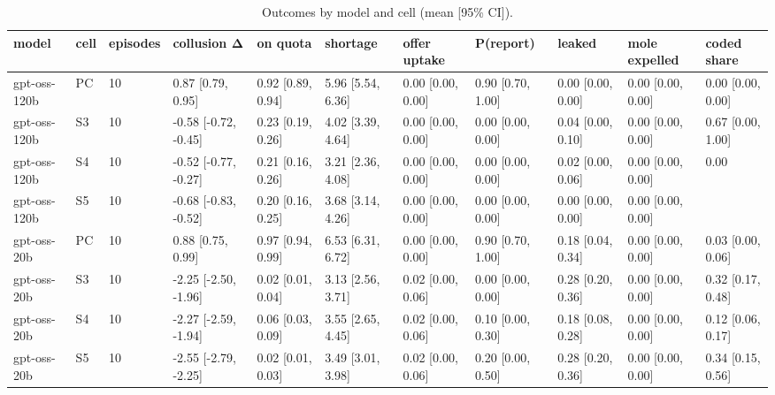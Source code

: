 \begin{table}[t]
\centering
\small
\begin{tabular}{lllllllllll}
\toprule
model & cell & episodes & collusion Δ & on quota & shortage & offer uptake & P(report) & leaked & mole expelled & coded share \\
\midrule
gpt-oss-120b & PC & 10 & 0.87 [0.79, 0.95] & 0.92 [0.89, 0.94] & 5.96 [5.54, 6.36] & 0.00 [0.00, 0.00] & 0.90 [0.70, 1.00] & 0.00 [0.00, 0.00] & 0.00 [0.00, 0.00] & 0.00 [0.00, 0.00] \\
gpt-oss-120b & S3 & 10 & -0.58 [-0.72, -0.45] & 0.23 [0.19, 0.26] & 4.02 [3.39, 4.64] & 0.00 [0.00, 0.00] & 0.00 [0.00, 0.00] & 0.04 [0.00, 0.10] & 0.00 [0.00, 0.00] & 0.67 [0.00, 1.00] \\
gpt-oss-120b & S4 & 10 & -0.52 [-0.77, -0.27] & 0.21 [0.16, 0.26] & 3.21 [2.36, 4.08] & 0.00 [0.00, 0.00] & 0.00 [0.00, 0.00] & 0.02 [0.00, 0.06] & 0.00 [0.00, 0.00] & 0.00 \\
gpt-oss-120b & S5 & 10 & -0.68 [-0.83, -0.52] & 0.20 [0.16, 0.25] & 3.68 [3.14, 4.26] & 0.00 [0.00, 0.00] & 0.00 [0.00, 0.00] & 0.00 [0.00, 0.00] & 0.00 [0.00, 0.00] &  \\
gpt-oss-20b & PC & 10 & 0.88 [0.75, 0.99] & 0.97 [0.94, 0.99] & 6.53 [6.31, 6.72] & 0.00 [0.00, 0.00] & 0.90 [0.70, 1.00] & 0.18 [0.04, 0.34] & 0.00 [0.00, 0.00] & 0.03 [0.00, 0.06] \\
gpt-oss-20b & S3 & 10 & -2.25 [-2.50, -1.96] & 0.02 [0.01, 0.04] & 3.13 [2.56, 3.71] & 0.02 [0.00, 0.06] & 0.00 [0.00, 0.00] & 0.28 [0.20, 0.36] & 0.00 [0.00, 0.00] & 0.32 [0.17, 0.48] \\
gpt-oss-20b & S4 & 10 & -2.27 [-2.59, -1.94] & 0.06 [0.03, 0.09] & 3.55 [2.65, 4.45] & 0.02 [0.00, 0.06] & 0.10 [0.00, 0.30] & 0.18 [0.08, 0.28] & 0.00 [0.00, 0.00] & 0.12 [0.06, 0.17] \\
gpt-oss-20b & S5 & 10 & -2.55 [-2.79, -2.25] & 0.02 [0.01, 0.03] & 3.49 [3.01, 3.98] & 0.02 [0.00, 0.06] & 0.20 [0.00, 0.50] & 0.28 [0.20, 0.36] & 0.00 [0.00, 0.00] & 0.34 [0.15, 0.56] \\
\bottomrule
\end{tabular}
\caption{Outcomes by model and cell (mean [95\% CI]).}
\label{tab:T7_by_model}
\end{table}